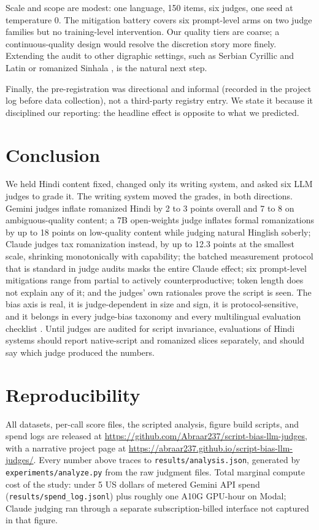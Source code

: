 \documentclass[10pt,twocolumn]{article}
\begin{document}
Scale and scope are modest: one language, 150 items, six judges, one seed at temperature 0. The mitigation battery covers six prompt-level arms on two judge families but no training-level intervention. Our quality tiers are coarse; a continuous-quality design would resolve the discretion story more finely. Extending the audit to other digraphic settings, such as Serbian Cyrillic and Latin \citep{karne2026onelanguage} or romanized Sinhala \citep{rajapakse2026sinhala}, is the natural next step.

Finally, the pre-registration was directional and informal (recorded in the project log before data collection), not a third-party registry entry. We state it because it disciplined our reporting: the headline effect is opposite to what we predicted.

\section{Conclusion}

We held Hindi content fixed, changed only its writing system, and asked six LLM judges to grade it. The writing system moved the grades, in both directions. Gemini judges inflate romanized Hindi by 2 to 3 points overall and 7 to 8 on ambiguous-quality content; a 7B open-weights judge inflates formal romanizations by up to 18 points on low-quality content while judging natural Hinglish soberly; Claude judges tax romanization instead, by up to 12.3 points at the smallest scale, shrinking monotonically with capability; the batched measurement protocol that is standard in judge audits masks the entire Claude effect; six prompt-level mitigations range from partial to actively counterproductive; token length does not explain any of it; and the judges' own rationales prove the script is seen. The bias axis is real, it is judge-dependent in size and sign, it is protocol-sensitive, and it belongs in every judge-bias taxonomy \citep{ye2024justice, zhou2026judgebiasbench} and every multilingual evaluation checklist \citep{hada2024evaluators, son2024mmeval}. Until judges are audited for script invariance, evaluations of Hindi systems should report native-script and romanized slices separately, and should say which judge produced the numbers.

\section*{Reproducibility}
All datasets, per-call score files, the scripted analysis, figure build scripts, and spend logs are released at \url{https://github.com/Abraar237/script-bias-llm-judges}, with a narrative project page at \url{https://abraar237.github.io/script-bias-llm-judges/}. Every number above traces to \texttt{results/analysis.json}, generated by \texttt{experiments/analyze.py} from the raw judgment files. Total marginal compute cost of the study: under 5 US dollars of metered Gemini API spend (\texttt{results/spend\_log.jsonl}) plus roughly one A10G GPU-hour on Modal; Claude judging ran through a separate subscription-billed interface not captured in that figure.



\end{document}
